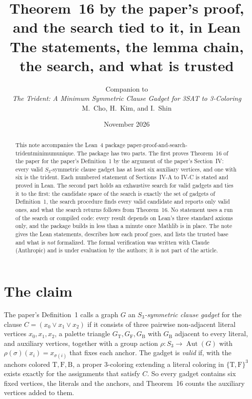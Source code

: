 \documentclass[11pt,a4paper]{article}
\title{Theorem~16 by the paper's proof, and the search tied to it, in Lean\\[2pt]
\large The statements, the lemma chain, the search, and what is trusted}
\author{Companion to\\ \emph{The Trident: A Minimum Symmetric Clause Gadget for 3SAT to 3-Coloring}\\
M.~Cho, H.~Kim, and I.~Shin}
\date{November 2026}
\newcommand{\leanus}{\textunderscore\allowbreak}
\newcommand{\lean}[1]{{\ttfamily\let\_\leanus #1}}
\newcommand{\GT}{G_{\mathrm{T}}}
\newcommand{\GF}{G_{\mathrm{F}}}
\newcommand{\GB}{G_{\mathrm{B}}}
\newcommand{\T}{\mathrm{T}}
\newcommand{\F}{\mathrm{F}}
\newcommand{\B}{\mathrm{B}}
\begin{document}
\maketitle

\begin{abstract}
\noindent
This note accompanies the Lean~4 package
\lean{paper-proof-and-search-trident\_minimum\_unique}. The package has two
parts. The
first proves Theorem~16 of the paper for the paper's Definition~1 by the
argument of the paper's Section~IV: every valid $S_3$-symmetric clause gadget
has at least six auxiliary vertices, and one with six is the trident. Each
numbered statement of Sections~IV-A to IV-C is stated and proved in Lean.
The second part holds an exhaustive search for valid gadgets and ties it to
the first: the candidate space of the search is exactly the set of gadgets of
Definition~1, the search procedure finds every valid candidate and reports
only valid ones, and what the search returns follows from Theorem~16. No statement
uses a run of the search or compiled code: every result depends on Lean's
three standard axioms only, and the package builds in less than a minute
once Mathlib is in place. The note gives the Lean statements, describes how
each proof goes, and lists the trusted base and what is \emph{not}
formalized. The formal verification was written with Claude (Anthropic) and
is under evaluation by the authors; it is not part of the article.
\end{abstract}

\tableofcontents

\section{The claim}\label{sec:claim}

The paper's Definition~1 calls a graph $G$ an \emph{$S_3$-symmetric clause
gadget} for the clause $C=(x_0\lor x_1\lor x_2)$ if it consists of three
pairwise non-adjacent literal vertices $x_0,x_1,x_2$, a palette triangle
$\GT,\GF,\GB$ with $\GB$ adjacent to every literal, and auxiliary vertices,
together with a group action $\rho:S_3\to\operatorname{Aut}(G)$ with
$\rho(\sigma)(x_i)=x_{\sigma(i)}$ that fixes each anchor. The gadget is
\emph{valid} if, with the anchors colored $\T,\F,\B$, a proper 3-coloring
extending a literal coloring in $\{\T,\F\}^3$ exists exactly for the
assignments that satisfy $C$. So every gadget contains six fixed vertices,
the literals and the anchors, and Theorem~16 counts the auxiliary vertices
added to them.
\end{document}
